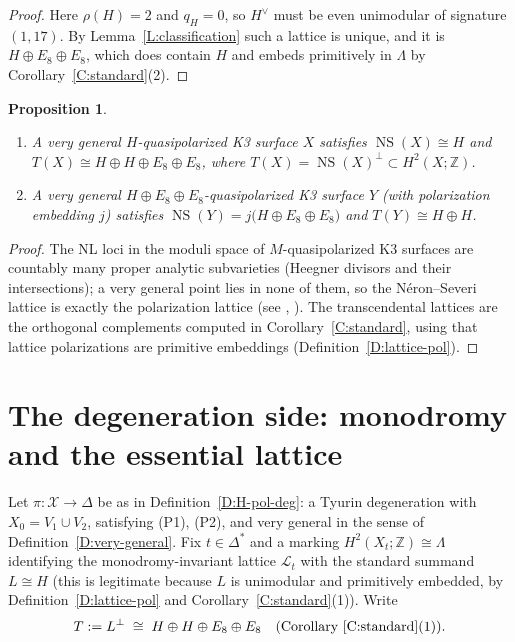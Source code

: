 \documentclass[11pt]{amsart}
\theoremstyle{plain}
\newtheorem{proposition}[theorem]{Proposition}
\theoremstyle{definition}
\theoremstyle{remark}
\numberwithin{equation}{section}
\begin{document}
\begin{proof}
Here \(\rho(H)=2\) and \(q_{H}=0\), so \(H^{\vee}\) must be even unimodular
of signature \((1,17)\). By Lemma~\ref{L:classification} such a lattice is
unique, and it is \(H\oplus E_{8}\oplus E_{8}\), which does contain \(H\)
and embeds primitively in \(\Lambda\) by
Corollary~\ref{C:standard}(2).
\end{proof}

\begin{proposition}\label{P:very-general-NS}
\begin{enumerate}
\item A very general \(H\)-quasipolarized K3 surface \(X\) satisfies
\(\operatorname{NS}(X)\cong H\) and
\(T(X)\cong H\oplus H\oplus E_{8}\oplus E_{8}\), where
\(T(X)=\operatorname{NS}(X)^{\perp}\subset H^{2}(X;\mathbb Z)\).
\item A very general \(H\oplus E_{8}\oplus E_{8}\)-quasipolarized K3 surface
\(Y\) (with polarization embedding \(j\)) satisfies
\(\operatorname{NS}(Y)=j\bigl(H\oplus E_{8}\oplus E_{8}\bigr)\) and
\(T(Y)\cong H\oplus H\).
\end{enumerate}
\end{proposition}

\begin{proof}
The NL loci in the moduli space of \(M\)-quasipolarized K3 surfaces are
countably many proper analytic subvarieties (Heegner divisors and their
intersections); a very general point lies in none of them, so the N\'eron--Severi
lattice is exactly the polarization lattice (see
\cite[Chs.\ 5--7]{huybrechts}, \cite[\S 1]{dolgachevmirror}). The
transcendental lattices are the orthogonal complements computed in
Corollary~\ref{C:standard}, using that lattice polarizations are primitive
embeddings (Definition~\ref{D:lattice-pol}).
\end{proof}

\section{The degeneration side: monodromy and the essential lattice}
\label{S:degeneration}

Let \(\pi\colon\mathcal X\to\Delta\) be as in
Definition~\ref{D:H-pol-deg}: a Tyurin degeneration with
\(X_{0}=V_{1}\cup V_{2}\), satisfying (P1), (P2), and very general in the
sense of Definition~\ref{D:very-general}. Fix \(t\in\Delta^{*}\) and a marking
\(H^{2}(X_{t};\mathbb Z)\cong\Lambda\) identifying the monodromy-invariant
lattice \(\mathcal L_{t}\) with the standard summand \(L\cong H\)
(this is legitimate because \(L\) is unimodular and primitively embedded,
by Definition~\ref{D:lattice-pol} and Corollary~\ref{C:standard}(1)).
Write
\[
T:=L^{\perp}\;\cong\;H\oplus H\oplus E_{8}\oplus E_{8}
\quad\text{(Corollary~\ref{C:standard}(1)).}
\]
\end{document}

